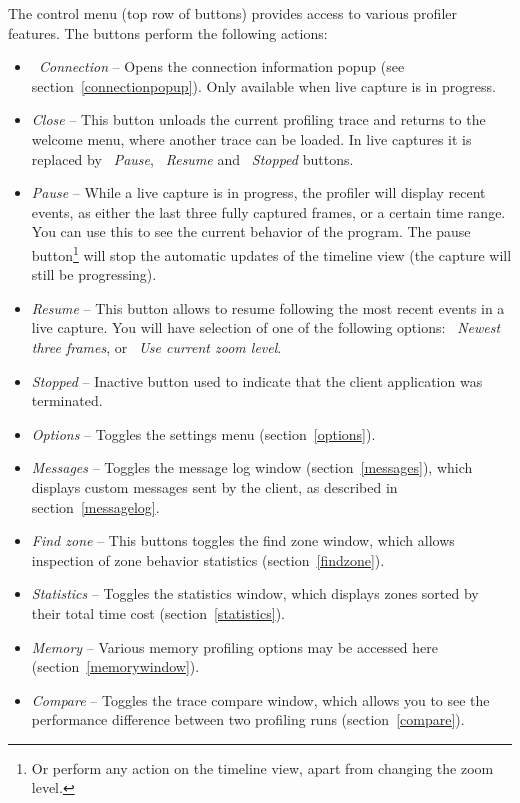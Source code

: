 \documentclass[hidelinks,titlepage,a4paper]{article}
\begin{document}
The control menu (top row of buttons) provides access to various profiler features. The buttons perform the following actions:

\begin{itemize}
\item \emph{\faWifi{}~Connection} -- Opens the connection information popup (see section~\ref{connectionpopup}). Only available when live capture is in progress.
\item \emph{\faPowerOff{} Close} -- This button unloads the current profiling trace and returns to the welcome menu, where another trace can be loaded. In live captures it is replaced by \emph{\faPause{}~Pause}, \emph{\faPlay{}~Resume} and \emph{\faSquare{}~Stopped} buttons.
\item \emph{\faPause{} Pause} -- While a live capture is in progress, the profiler will display recent events, as either the last three fully captured frames, or a certain time range. You can use this to see the current behavior of the program. The pause button\footnote{Or perform any action on the timeline view, apart from changing the zoom level.} will stop the automatic updates of the timeline view (the capture will still be progressing).
\item \emph{\faPlay{} Resume} -- This button allows to resume following the most recent events in a live capture. You will have selection of one of the following options: \emph{\faSearchPlus{}~Newest three frames}, or \emph{\faRulerHorizontal{}~Use current zoom level}.
\item \emph{\faSquare{} Stopped} -- Inactive button used to indicate that the client application was terminated.
\item \emph{\faCog{} Options} -- Toggles the settings menu (section~\ref{options}).
\item \emph{\faTags{} Messages} -- Toggles the message log window (section~\ref{messages}), which displays custom messages sent by the client, as described in section~\ref{messagelog}.
\item \emph{\faSearch{} Find zone} -- This buttons toggles the find zone window, which allows inspection of zone behavior statistics (section~\ref{findzone}).
\item \emph{\faSortAmountUp{} Statistics} -- Toggles the statistics window, which displays zones sorted by their total time cost (section~\ref{statistics}).
\item \emph{\faMemory{} Memory} -- Various memory profiling options may be accessed here (section~\ref{memorywindow}).
\item \emph{\faBalanceScale{} Compare} -- Toggles the trace compare window, which allows you to see the performance difference between two profiling runs (section~\ref{compare}).

\end{itemize}
\end{document}
